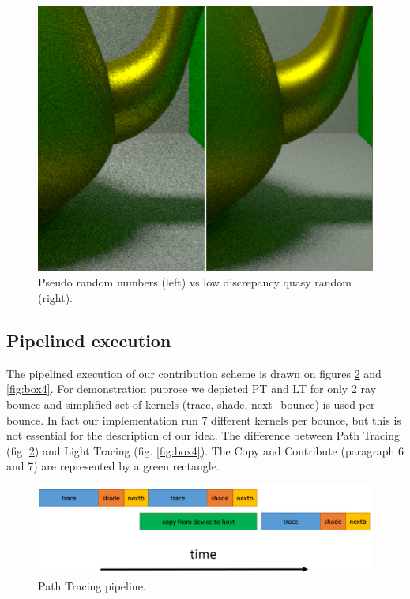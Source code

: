 \documentclass[twoside,twocolumn,10pt]{article}
\begin{document}
\begin{figure}[htb]
	\centering
	\includegraphics[width=1.0\linewidth]{images/qmc2.png}
	\caption{Pseudo random numbers (left) vs low discrepancy quasy random (right).}
	\label{fig:box2}
\end{figure}

\subsection{Pipelined execution}

The pipelined execution of our contribution scheme is drawn on figures \ref{fig:box3} and \ref{fig:box4}. For demonstration puprose we depicted PT and LT for only 2 ray bounce and simplified set of kernels (trace, shade, next\_bounce) is used per bounce. In fact our implementation run 7 different kernels per bounce, but this is not essential for the description of our idea. The difference between Path Tracing (fig. \ref{fig:box3}) and Light Tracing (fig. \ref{fig:box4}). The Copy and Contribute (paragraph 6 and 7) are represented by a green rectangle.


\begin{figure}[htb]
	\centering
	\includegraphics[width=1.0\linewidth]{images/pipeline1.png}
	\caption{Path Tracing pipeline.}
	\label{fig:box3}
\end{figure}
\end{document}
